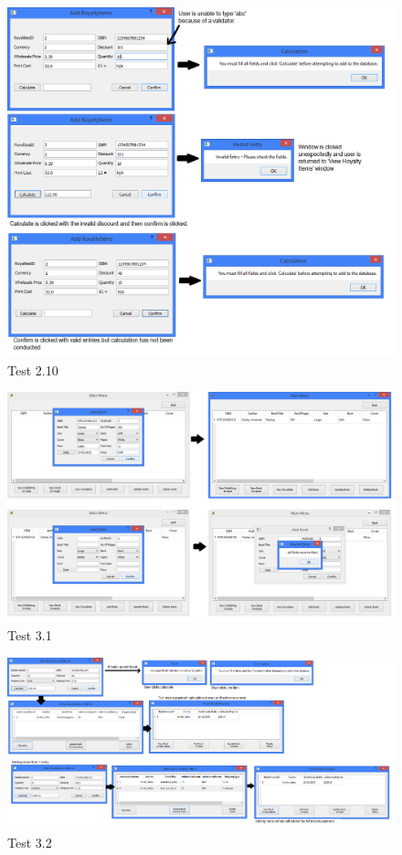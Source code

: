 \begin{landscape}
\begin{figure}[H]
    \includegraphics[width=\textwidth]{./Testing/Evidence/Series2/RoyaltyDiscountValidation.png}
    \caption{Test 2.10}  \label{fig:RoyaltyDiscountValidation}
\end{figure}

\begin{figure}[H]
    \includegraphics[width=\textwidth]{./Testing/Evidence/Series3/AddBookValidation.png}
    \caption{Test 3.1}  \label{fig:AddBookValidation}
\end{figure}

\begin{figure}[H]
    \includegraphics[width=\textwidth]{./Testing/Evidence/Series3/AddInvoiceItemTest.png}
    \caption{Test 3.2}  \label{fig:AddInvoiceItemTest}
\end{figure}


\end{landscape}
